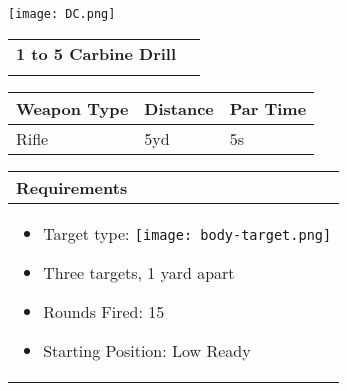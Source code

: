 \documentclass[../Cover.tex]{subfiles}
\begin{document}
	\begin{minipage}[t][0.2\textheight][t]{0.1\textwidth} 
		\texttt{[image: DC.png]}
	\end{minipage}
	\hfill
	\begin{minipage}[t][0.2\textheight][t]{0.8\textwidth}
		\begin{tabular}{ p{} l  }		
			\\	
			\small \textbf{1 to 5 Carbine Drill} \\
			\\[0.09\textheight]
		\end{tabular}
		\quad
		\begin{tabular}{ | p{} | p{} | p{} |}
			\hline
			\rowcolor[HTML]{C0C0C0}\tiny Weapon Type & \tiny Distance & \tiny Par Time\\ 
			\hline
			\tiny Rifle & \tiny 5yd & \tiny 5s \\ %
			\hline
		\end{tabular}
	\end{minipage}
	\begin{tabular}{p{}}
		\small Requirements \\
		\hline
		\tiny \begin{itemize} %
			\item Target type: \texttt{[image: body-target.png]}
			\item Three targets, 1 yard apart
			\item Rounds Fired: 15
			\item Starting Position: Low Ready
		\end{itemize}
		\begin{center}
			
		\end{center}
				
		\\[0.6\textheight]
	\end{tabular}
\end{document}
